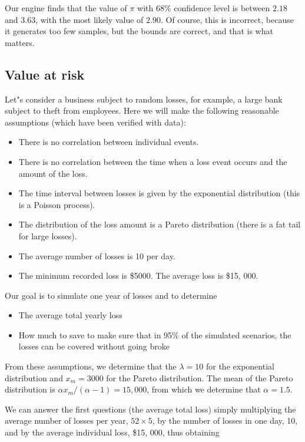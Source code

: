 \documentclass[justified, sixbynine]{tufte-book}
\theoremstyle{plain}%
\newtheorem * {corollary}{Corollary}
\theoremstyle{definition}
\theoremstyle{remark}
\newtheorem * {remark}{Remark}
\newtheorem * {note}{Note}
\begin{document}
\begin{fullwidth}
Our engine finds that the value of $\pi$ with 68\% confidence level is between $2.18$ and $3.63$, with the most likely value of $2.90$. Of course, this is incorrect, because it generates too few samples, but the bounds are correct, and that is what matters.

\subsection{Value at risk}

Let"s consider a business subject to random losses, for example, a large bank subject to theft from employees.
Here we will make the following reasonable assumptions (which have been verified with data):
\begin{itemize}
\item There is no correlation between individual events.
\item There is no correlation between the time when a loss event occurs and the amount of the loss.
\item The time interval between losses is given by the exponential distribution (this is a Poisson process).
\item The distribution of the loss amount is a Pareto distribution (there is a fat tail for large losses).
\item The average number of losses is 10 per day.
\item The minimum recorded loss is \$5000. The average loss is \$15, 000.
\end{itemize}

Our goal is to simulate one year of losses and to determine

\begin{itemize}
\item The average total yearly loss
\item How much to save to make sure that in 95\% of the simulated scenarios, the losses can be covered without going broke
\end{itemize}

From these assumptions, we determine that the $\lambda=10$ for the exponential distribution and $x_m=3000$ for the Pareto distribution. The mean of the Pareto distribution is $\alpha x_m/(\alpha-1) = 15, 000$, from which we determine that $\alpha = 1.5$.

We can answer the first questions (the average total loss) simply multiplying the average number of losses per year, $52\times5$, by the number of losses in one day, 10, and by the average individual loss, \$15, 000, thus obtaining


\end{fullwidth}
\end{document}
